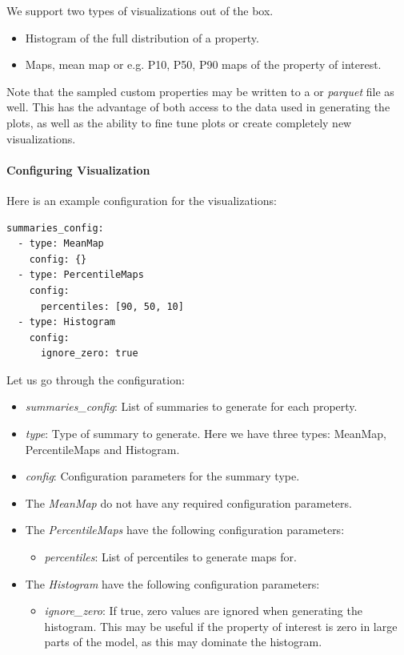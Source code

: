 \documentclass[note,screen,english,12pt,utf8]{nrdoc}
\begin{document}
We support two types of visualizations out of the box.

\begin{itemize}
    \item Histogram of the full distribution of a property.
    \item Maps, mean map or e.g. P10, P50, P90 maps of the property of interest.
\end{itemize}

Note that the sampled custom properties may be written to a 
or \emph{parquet} file as well. This has the advantage of both access to the
data used in generating the plots, as well as the ability to
fine tune plots or create completely new visualizations.

\paragraph{Configuring Visualization}

Here is an example configuration for the visualizations:
\begin{verbatim}
summaries_config:
  - type: MeanMap
    config: {}
  - type: PercentileMaps
    config:
      percentiles: [90, 50, 10]
  - type: Histogram
    config:
      ignore_zero: true
\end{verbatim}


Let us go through the configuration:
\begin{itemize}
    \item{
        \emph{summaries\_config}: List of summaries to generate for each property.
    }
    \item{
        \emph{type}: Type of summary to generate. Here we have three types:
        MeanMap, PercentileMaps and Histogram.
    }
    \item{
        \emph{config}: Configuration parameters for the summary type.
    }
    \item{
        The \emph{MeanMap} do not have any required configuration parameters.
    }
    \item{
        The \emph{PercentileMaps} have the following configuration parameters:
        \begin{itemize}
            \item \emph{percentiles}: List of percentiles to generate maps for.
        \end{itemize}
    }
    \item{
        The \emph{Histogram} have the following configuration parameters:
        \begin{itemize}
            \item \emph{ignore\_zero}: If true, zero values are ignored when generating the histogram.
              This may be useful if the property of interest is zero in large parts of the model,
              as this may dominate the histogram.
        \end{itemize}
    }
\end{itemize}
\end{document}

